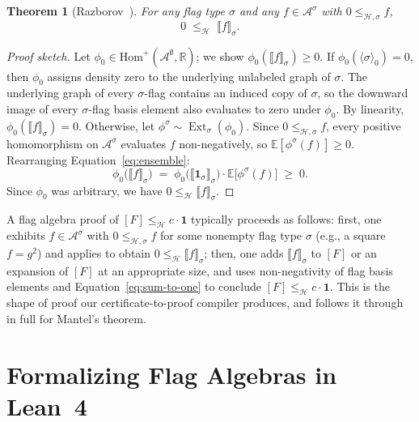 \documentclass[acmsmall,screen=true,acmthm=false]{acmart}
\newtheorem{theorem}{Theorem}[section]
\newcommand{\poshom}[1]{\mathrm{Hom}^+(\mathcal{A}^{#1}, \mathbb{R})}
\newcommand{\Ext}{\operatorname{Ext}}
\begin{document}
\begin{theorem}[Razborov~{\cite{razborov2007flag}}]\label{thm:downward-nonneg}
  For any flag type $\sigma$ and any $f \in \mathcal{A}^\sigma$ with $0 \leq_{\mathcal{H},\sigma} f$,
  \[
    0 \;\leq_{\mathcal{H}}\; \llbracket f \rrbracket_\sigma.
  \]
\end{theorem}
\begin{proof}[Proof sketch]
  Let $\phi_0 \in \poshom{\emptyset}$; we show $\phi_0(\llbracket f \rrbracket_\sigma) \geq 0$.
  If $\phi_0(\langle\sigma\rangle_0) = 0$, then $\phi_0$ assigns density zero
  to the underlying unlabeled graph of $\sigma$.  The underlying graph of
  every $\sigma$-flag contains an induced copy of $\sigma$, so the downward
  image of every $\sigma$-flag basis element also evaluates to zero under
  $\phi_0$.  By linearity, $\phi_0(\llbracket f \rrbracket_\sigma) = 0$.
  Otherwise, let $\phi^\sigma \sim \Ext_\sigma(\phi_0)$.
  Since $0 \leq_{\mathcal{H},\sigma} f$, every positive homomorphism on
  $\mathcal{A}^\sigma$ evaluates $f$ non-negatively, so
  $\mathbb{E}[\phi^\sigma(f)] \geq 0$.
  Rearranging Equation~\eqref{eq:ensemble}:
  \[
    \phi_0\bigl(\llbracket f \rrbracket_\sigma\bigr)
    \;=\;
    \phi_0\bigl(\llbracket \mathbf{1}_\sigma \rrbracket_\sigma\bigr)
    \cdot
    \mathbb{E}\bigl[\phi^\sigma(f)\bigr]
    \;\geq\; 0.
  \]
  Since $\phi_0$ was arbitrary, we have $0 \leq_{\mathcal{H}} \llbracket f \rrbracket_\sigma$.
\end{proof}

A flag algebra proof of $[F] \leq_{\mathcal{H}} c\cdot\mathbf{1}$ typically proceeds as follows:
first, one exhibits $f \in \mathcal{A}^\sigma$ with $0 \leq_{\mathcal{H},\sigma} f$ for some
nonempty flag type $\sigma$ (e.g., a square $f = g^2$) and applies
 to obtain $0 \leq_{\mathcal{H}} \llbracket f \rrbracket_\sigma$;
then, one adds $\llbracket f \rrbracket_\sigma$ to $[F]$ or an expansion of $[F]$
at an appropriate size, and uses non-negativity of flag basis elements and
Equation~\eqref{eq:sum-to-one} to conclude $[F] \leq_{\mathcal{H}} c\cdot\mathbf{1}$.
This is the shape of proof our certificate-to-proof compiler produces, and
 follows it through in full for Mantel's
theorem.

\section{Formalizing Flag Algebras in Lean~4}
\label{sec:abstract}
\end{document}
